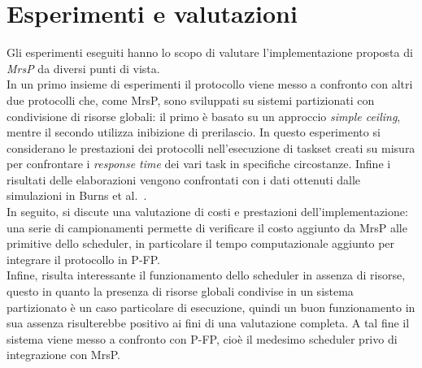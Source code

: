 











\section{Esperimenti e valutazioni}
\label{sec:esperimenti}

\noindent Gli esperimenti eseguiti hanno lo scopo di valutare l'implementazione proposta di \emph{MrsP} da diversi punti di vista.\\

\noindent In un primo insieme di esperimenti il protocollo viene messo a confronto con altri due protocolli che, come MrsP, sono sviluppati su sistemi partizionati con condivisione di risorse globali: il primo è basato su un approccio \textit{simple ceiling}, mentre il secondo utilizza inibizione di prerilascio. In questo esperimento si considerano le prestazioni dei protocolli nell'esecuzione di taskset creati su misura per confrontare i \textit{response time} dei vari task in specifiche circostanze. Infine i risultati delle elaborazioni vengono confrontati con i dati ottenuti dalle simulazioni in Burns et al.~\cite{Burns:2013:SCM:2547348.2547350}.\\

\noindent In seguito, si discute una valutazione di costi e prestazioni dell'implementazione: una serie di campionamenti permette di verificare il costo aggiunto da MrsP alle primitive dello scheduler, in particolare il tempo computazionale aggiunto per integrare il protocollo in P-FP.\\

\noindent Infine, risulta interessante il funzionamento dello scheduler in assenza di risorse, questo in quanto la presenza di risorse globali condivise in un sistema partizionato è un caso particolare di esecuzione, quindi un buon funzionamento in sua assenza risulterebbe positivo ai fini di una valutazione completa. A tal fine il sistema viene messo a confronto con P-FP, cioè il medesimo scheduler privo di integrazione con MrsP.\\

